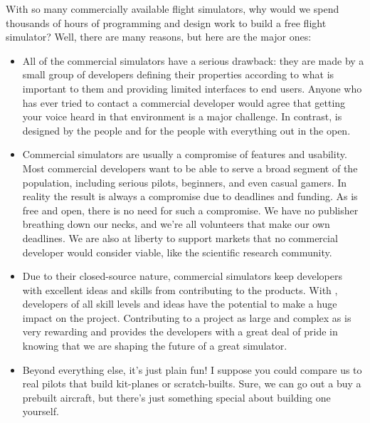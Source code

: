 With so many commercially available flight simulators, why would we spend
thousands of hours of programming and design work to build a free flight
simulator?  Well, there are many reasons, but here are the major ones:

\begin{itemize}
 \item All of the commercial simulators have a serious drawback: they are made
 by a small group of developers defining their properties according to what
 is important to them and providing limited interfaces to end users.  Anyone
 who has ever tried to contact a commercial developer would agree that getting
 your voice heard in that environment is a major challenge.  In contrast,
 \FlightGear{} is designed by the people and for the people with everything
 out in the open.
 \item Commercial simulators are usually a compromise of features and
 usability.  Most commercial developers want to be able to serve a broad
 segment of the population, including serious pilots, beginners, and even
 casual gamers.  In reality the result is always a compromise due to deadlines
 and funding.  As \FlightGear{} is free and open, there is no need for such a
 compromise.  We have no publisher breathing down our necks, and we're all
 volunteers that make our own deadlines.  We are also at liberty to support
 markets that no commercial developer would consider viable, like the
 scientific research community.
 \item Due to their closed-source nature, commercial simulators keep developers
 with excellent ideas and skills from contributing to the products.  With
 \FlightGear{}, developers of all skill levels and ideas have the potential
 to make a huge impact on the project.  Contributing to a project as large
 and complex as \FlightGear{} is very rewarding and provides the developers
 with a great deal of pride in knowing that we are shaping the future of a
 great simulator.
 \item Beyond everything else, it's just plain fun!  I suppose you could
 compare us to real pilots that build kit-planes or scratch-builts.  Sure,
 we can go out a buy a prebuilt aircraft, but there's just something special
 about building one yourself.
\end{itemize}
\medskip


